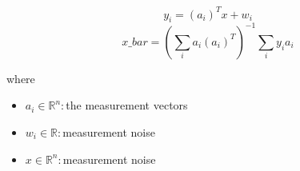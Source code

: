 \documentclass[12pt]{article}
\begin{document}
\[
\textit{y}_{ \textit{i} } = (\textit{a}_{ \textit{i} })^T\textit{x} + \textit{w}_{ \textit{i} }
\]
\[
\textit{x\_bar} = (\sum_\textit{i} \textit{a}_{ \textit{i} }(\textit{a}_{ \textit{i} })^T)^{-1}\sum_\textit{i} \textit{y}_{ \textit{i} }\textit{a}_{ \textit{i} }
\]

where
\begin{itemize}
\item $\textit{a}_{\textit{i}} \in \mathbb{R}^{ \textit{n}}:$the measurement vectors  
\item $\textit{w}_{\textit{i}} \in \mathbb{{R}}:$measurement noise 
\item $\textit{x} \in \mathbb{R}^{ \textit{n}}:$measurement noise 
\end{itemize}
\end{document}
